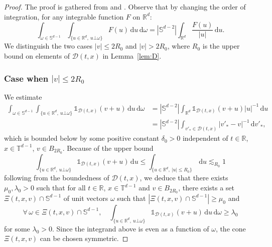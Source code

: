 \documentclass[JEP,XML,SOM,Unicode,NoFloatCountersInSection]{cedram}
\theoremstyle{plain}
\theoremstyle{definition}
\numberwithin{equation}{section}
\newcommand{\R}{\mathbb R}
\newcommand{\dd} {\, \mathrm{d}}
\newcommand{\one}{\mathds{1}}
\begin{document}
\begin{proof}
The proof is gathered from \cite[Lem.\,4.8]{luis} and
\cite[Lem.\,7.1]{luis}. Observe that by changing the order of
integration, for any integrable function $F$ on $\R^d$:
\[
\int_{\omega \in \mathbb{S}^{d-1}} \int_{\{u \in \R^d, \ u \bot
\omega\}} F(u) \dd u \dd \omega = \left| \mathbb{S}^{d-2}\right|
\int_{\R^d} \frac{F(u)}{|u|} \dd u.
\]
We distinguish the two cases $|v| \le 2 R_0$ and $|v| > 2 R_0$,
where $R_0$ is the upper bound on elements of $\mathcal{D}(t,x)$ in
Lemma~\ref{lem:D}.

\subsubsection*{Case when $|v| \le 2 R_0$}
We estimate
\begin{align*}
\int_{\omega \in \mathbb{S}^{d-1}} \int_{\{ u \in \R^{d}, \ u \bot \omega \}}
\one_{\mathcal{D}(t,x)}(v+u) \dd u \dd \omega
& = \left| \mathbb{S}^{d-2}
\right| \int_{\R^d} \one_{\mathcal{D}(t,x)}(v+u) |u|^{-1} \dd u \\
& = \left| \mathbb{S}^{d-2}
\right| \int_{v'_* \in \mathcal{D}(t,x)} |v'_*-v|^{-1} \dd v'_*,
\end{align*}
which is bounded below by some positive constant $\delta_0>0$
independent of $t \in \R$, $x \in \mathbb{T}^{d-1}$,
$v \in B_{2R_0}$. Because of the upper bound
\begin{equation}\label{eq:upper-cone}
\int_{\{ u \in \R^{d}, \ u \bot \omega \}}
\one_{\mathcal{D}(t,x)}(v+u) \dd u \le
\int_{\{ u \in \R^{d}, \ |u| \le R_0 \}}
\dd u \lesssim_{R_0} 1
\end{equation}
following from the boundedness of $\mathcal{D}(t,x)$, we deduce that
there exists $\mu_0,\lambda_0>0$ such that for all $t \in \R$,
$x \in \mathbb{T}^{d-1}$ and $v \in B_{2R_0}$, there exists a set
$\Xi(t,x,v) \cap \mathbb{S}^{d-1}$ of unit vectors $\omega$ such
that $| \Xi(t,x,v) \cap \mathbb{S}^{d-1} | \ge \mu_0$ and
\[
\forall \, \omega \in \Xi(t,x,v) \cap \mathbb{S}^{d-1}, \quad
\int_{\{ u \in \R^{d}, \ u \bot \omega \}}
\one_{\mathcal{D}(t,x)}(v+u) \dd u \dd \omega \ge \lambda_0
\]
for some $\lambda_0>0$. Since the integrand above is even as a
function of $\omega$, the cone $\Xi(t,x,v)$ can be chosen symmetric.


\end{proof}
\end{document}

